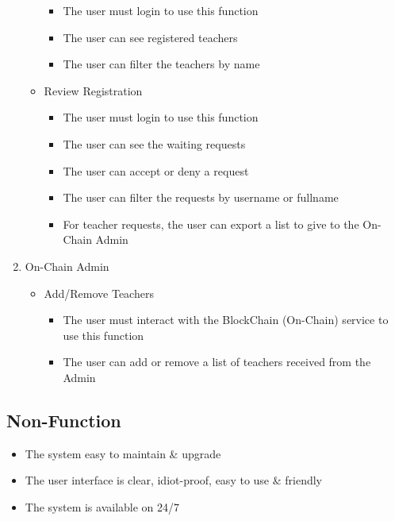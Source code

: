 \documentclass[
  letterpaper,
  DIV=11,
  numbers=noendperiod]{scrreprt}
\providecommand{\tightlist}{%
  \setlength{\itemsep}{0pt}\setlength{\parskip}{0pt}}\usepackage{longtable,booktabs,array}
\begin{document}
\begin{enumerate}
\begin{itemize}
    \begin{itemize}
    \tightlist
    \item
      The user must login to use this function
    \item
      The user can see registered teachers
    \item
      The user can filter the teachers by name
    \end{itemize}
  \item
    Review Registration

    \begin{itemize}
    \tightlist
    \item
      The user must login to use this function
    \item
      The user can see the waiting requests
    \item
      The user can accept or deny a request
    \item
      The user can filter the requests by username or fullname
    \item
      For teacher requests, the user can export a list to give to the
      On-Chain Admin
    \end{itemize}
  \end{itemize}
\item
  On-Chain Admin

  \begin{itemize}
  \tightlist
  \item
    Add/Remove Teachers

    \begin{itemize}
    \tightlist
    \item
      The user must interact with the BlockChain (On-Chain) service to
      use this function
    \item
      The user can add or remove a list of teachers received from the
      Admin
    \end{itemize}
  \end{itemize}
\end{enumerate}

\hypertarget{non-function}{%
\subsection{Non-Function}\label{non-function}}

\begin{itemize}
\tightlist
\item
  The system easy to maintain \& upgrade
\item
  The user interface is clear, idiot-proof, easy to use \& friendly
\item
  The system is available on 24/7
\end{itemize}
\end{document}
